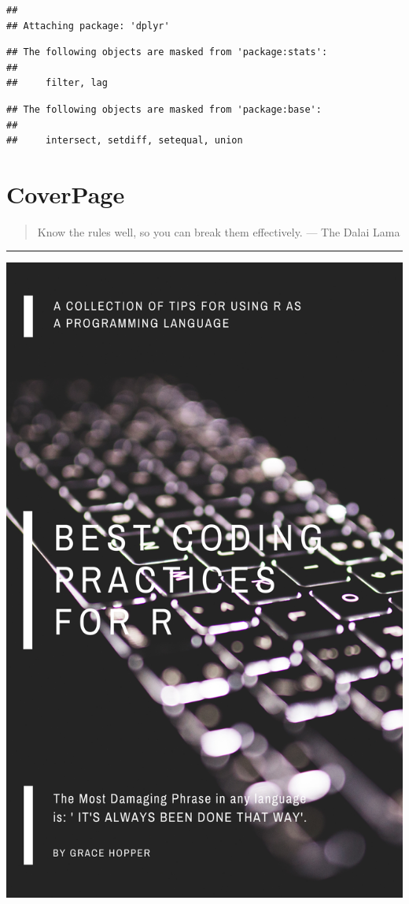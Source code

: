 \documentclass[
]{book}
\begin{document}
\begin{verbatim}
## 
## Attaching package: 'dplyr'
\end{verbatim}

\begin{verbatim}
## The following objects are masked from 'package:stats':
## 
##     filter, lag
\end{verbatim}

\begin{verbatim}
## The following objects are masked from 'package:base':
## 
##     intersect, setdiff, setequal, union
\end{verbatim}

\hypertarget{coverpage}{%
\chapter*{CoverPage}\label{coverpage}}

\begin{quote}
Know the rules well, so you can break them effectively.
--- The Dalai Lama
\end{quote}

\begin{center}\rule{0.5\linewidth}{0.5pt}\end{center}

\includegraphics{figures/cover.png}
\end{document}
